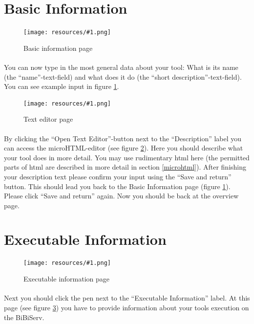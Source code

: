 \documentclass[a4paper,10pt]{book}
\newcommand{\bigpic}[1]{\texttt{[image: resources/\#1.png]}}
\begin{document}
\section{Basic Information}

\begin{figure}
 \bigpic{quickstart-basicInfo}
\caption{Basic information page}
\label{quickstart-basicinfo}
\end{figure}

\paragraph{} You can now type in the most general data about your tool: What is its name (the ``name''-text-field) and what does it do (the ``short description''-text-field). You can see example input in figure \ref{quickstart-basicinfo}.

\begin{figure}
 \bigpic{quickstart-editor}
\caption{Text editor page}
\label{quickstart-editor}
\end{figure}

\paragraph{} By clicking the ``Open Text Editor''-button next to the ``Description'' label you can access the microHTML-editor (see figure \ref{quickstart-editor}). Here you should describe what your tool does in more detail. You may use rudimentary html here (the permitted parts of html are described in more detail in section \ref{microhtml}). After finishing your description text please confirm your input using the ``Save and return'' button. This should lead you back to the Basic Information page (figure \ref{quickstart-basicinfo}). Please click ``Save and return'' again. Now you should be back at the overview page.

\section{Executable Information}

\begin{figure}
 \bigpic{quickstart-execInfo}
\caption{Executable information page}
\label{quickstart-execinfo}
\end{figure}

\paragraph{} Next you should click the pen next to the ``Executable Information'' label. At this page (see figure \ref{quickstart-execinfo}) you have to provide information about your tools execution on the BiBiServ.
\end{document}
